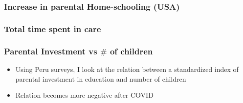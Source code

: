 \documentclass{beamer}
\begin{document}
\begin{frame}
    \label{update_scott}
    \frametitle{Increase in parental Home-schooling (USA)}
        {
    }
\end{frame}

\begin{frame}
    \label{update_scott}
    \frametitle{Total time spent in care}
        {
    }
\end{frame}

\begin{frame}
    \frametitle{Parental Investment vs $\#$ of children}
    \begin{itemize}
        \item Using Peru surveys, I look at the relation between a standardized index of parental investment in education and number of children
        \item Relation becomes more negative after COVID
    \end{itemize}
\end{frame}
\end{document}
